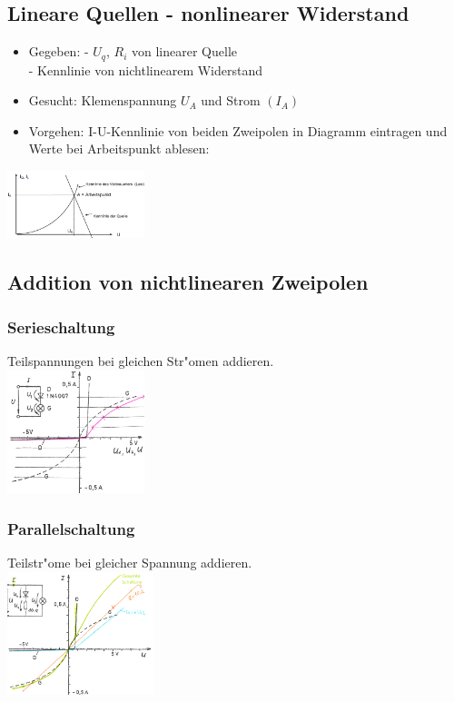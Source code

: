 \subsection{Lineare Quellen - nonlinearer Widerstand}
\begin{multicols}{2}
\begin{itemize}
\item Gegeben: - $U_q$, $R_i$ von linearer Quelle\\
 \hspace{1.6cm}- Kennlinie von nichtlinearem Widerstand\\
\item Gesucht: Klemenspannung $U_A$ und Strom $(I_A)$
\item Vorgehen: I-U-Kennlinie von beiden Zweipolen in Diagramm eintragen und Werte bei Arbeitspunkt ablesen:
\end{itemize}
\includegraphics[width=0.3\textwidth]{pics/quellen/nonlineUI}
\end{multicols}

\subsection{Addition von nichtlinearen Zweipolen}
\begin{multicols}{2}
\subsubsection{Serieschaltung}
Teilspannungen bei gleichen Str"omen addieren.\\
\includegraphics[width=0.3\textwidth]{pics/kennlinien/nonlinAddPar}
\subsubsection{Parallelschaltung}
 Teilstr"ome bei gleicher Spannung addieren.\\
\includegraphics[width=0.32\textwidth]{pics/kennlinien/nonlinAddSer}\\
\end{multicols}

